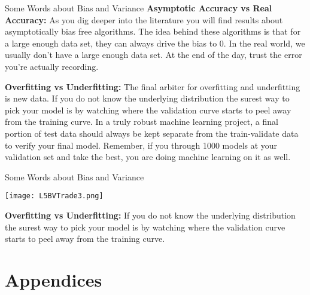 \documentclass[10pt, table, dvipsnames,handout]{beamer}
\begin{document}
\begin{frame}[fragile]{Some Words about Bias and Variance}
\textbf{Asymptotic Accuracy vs Real Accuracy:} As you dig deeper into the literature you will find results about asymptotically bias free algorithms. The idea behind these algorithms is that for a large enough data set, they can always drive the bias to 0. In the real world, we usually don't have a large enough data set. At the end of the day, trust the error you're actually recording.  \pause

\textbf{Overfitting vs Underfitting:} The final arbiter for overfitting and underfitting is new data. If you do not know the underlying distribution the surest way to pick your model is by watching where the validation curve starts to peel away from the training curve. In a truly robust machine learning project, a final portion of test data should always be kept separate from the train-validate data to verify your final model. Remember, if you through 1000 models at your validation set and take the best, you are doing machine learning on it as well. 



\end{frame}



\begin{frame}[fragile]{Some Words about Bias and Variance}
  \begin{minipage}[t][0.5\textheight][t]{\textwidth}
	  \centering \texttt{[image: L5BVTrade3.png]}
  \end{minipage}
  \vfill
  \begin{minipage}[t][0.5\textheight][t]{\textwidth}
\textbf{Overfitting vs Underfitting:} If you do not know the underlying distribution the surest way to pick your model is by watching where the validation curve starts to peel away from the training curve.
\end{minipage}




\end{frame}



\section{Appendices}
\end{document}
